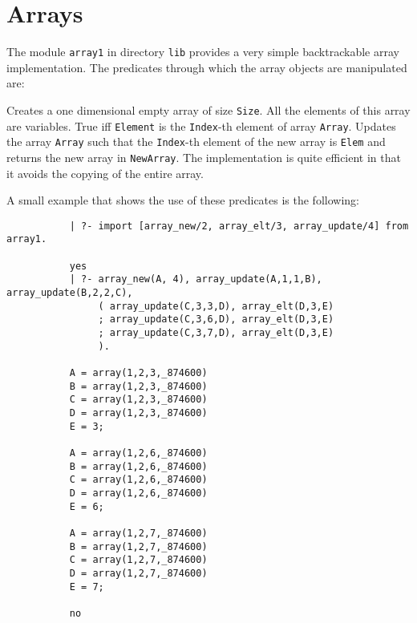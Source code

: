 \section{Arrays}

The module {\tt array1} in directory {\tt lib} provides a very simple 
backtrackable array implementation.  The predicates through which the 
array objects are manipulated are:

\begin{description}
    Creates a one dimensional empty array of size {\tt Size}.  All the 
    elements of this array are variables.
    True iff {\tt Element} is the {\tt Index}-th element of array 
    {\tt Array}.
    Updates the array {\tt Array} such that the {\tt Index}-th element
    of the new array is {\tt Elem} and returns the new array in 
    {\tt NewArray}.  The implementation is quite efficient in that it 
    avoids the copying of the entire array.
\end{description}

A small example that shows the use of these predicates is the following:
{\footnotesize
 \begin{verbatim}
           | ?- import [array_new/2, array_elt/3, array_update/4] from array1.

           yes
           | ?- array_new(A, 4), array_update(A,1,1,B), array_update(B,2,2,C),
                ( array_update(C,3,3,D), array_elt(D,3,E)
                ; array_update(C,3,6,D), array_elt(D,3,E)
                ; array_update(C,3,7,D), array_elt(D,3,E)
                ).

           A = array(1,2,3,_874600)
           B = array(1,2,3,_874600)
           C = array(1,2,3,_874600)
           D = array(1,2,3,_874600)
           E = 3;

           A = array(1,2,6,_874600)
           B = array(1,2,6,_874600)
           C = array(1,2,6,_874600)
           D = array(1,2,6,_874600)
           E = 6;

           A = array(1,2,7,_874600)
           B = array(1,2,7,_874600)
           C = array(1,2,7,_874600)
           D = array(1,2,7,_874600)
           E = 7;

           no
 \end{verbatim}
}


